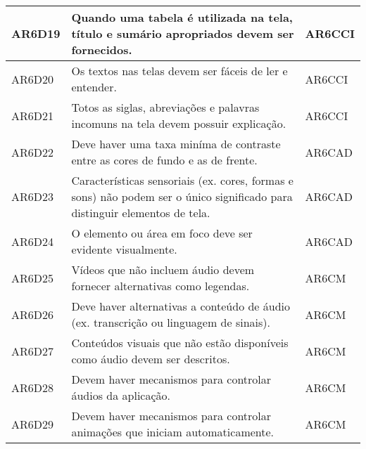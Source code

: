 \begin{table}[htb]
\begin{center}
\begin{tabular}{p{1.2cm}|p{12.0cm}|p{1.5cm}}
      \hline
      AR6D19          & Quando uma tabela é utilizada na tela, título e sumário apropriados devem ser fornecidos.                                                    & AR6CCI             \\
      \hline
      AR6D20          & Os textos nas telas devem ser fáceis de ler e entender.                                                                                      & AR6CCI             \\
      \hline
      AR6D21          & Totos as siglas, abreviações e palavras incomuns na tela devem possuir explicação.                                                           & AR6CCI             \\
      \hline
      AR6D22          & Deve haver uma taxa miníma de contraste entre as cores de fundo e as de frente.                                                              & AR6CAD             \\
      \hline
      AR6D23          & Características sensoriais (ex.\: cores, formas e sons) não podem ser o único significado para distinguir elementos de tela.                 & AR6CAD             \\
      \hline
      AR6D24          & O elemento ou área em foco deve ser evidente visualmente.                                                                                    & AR6CAD             \\
      \hline
      AR6D25          & Vídeos que não incluem áudio devem fornecer alternativas como legendas.                                                                      & AR6CM              \\
      \hline
      AR6D26          & Deve haver alternativas a conteúdo de áudio (ex.\: transcrição ou linguagem de sinais).                                                      & AR6CM              \\
      \hline
      AR6D27          & Conteúdos visuais que não estão disponíveis como áudio devem ser descritos.                                                                  & AR6CM              \\
      \hline
      AR6D28          & Devem haver mecanismos para controlar áudios da aplicação.                                                                                   & AR6CM              \\
      \hline
      AR6D29          & Devem haver mecanismos para controlar animações que iniciam automaticamente.                                                                 & AR6CM              \\

\end{tabular}
\end{center}
\end{table}
